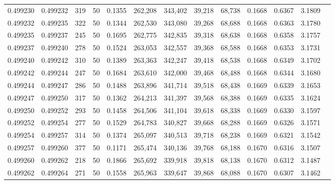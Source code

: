 \begin{tabular}{rrrrrrrrrrrrr}
0.499230 & 0.499232 & 319 &  50 &                                     0.1355 & 262,208 & 343,402 &  39,218 &  68,738 & 0.1668 & 0.6367 & 3.1809 \\
0.499232 & 0.499235 & 322 &  50 &                                     0.1344 & 262,530 & 343,080 &  39,268 &  68,688 & 0.1668 & 0.6363 & 3.1780 \\
0.499235 & 0.499237 & 245 &  50 &                                     0.1695 & 262,775 & 342,835 &  39,318 &  68,638 & 0.1668 & 0.6358 & 3.1757 \\
0.499237 & 0.499240 & 278 &  50 &                                     0.1524 & 263,053 & 342,557 &  39,368 &  68,588 & 0.1668 & 0.6353 & 3.1731 \\
0.499240 & 0.499242 & 310 &  50 &                                     0.1389 & 263,363 & 342,247 &  39,418 &  68,538 & 0.1668 & 0.6349 & 3.1702 \\
0.499242 & 0.499244 & 247 &  50 &                                     0.1684 & 263,610 & 342,000 &  39,468 &  68,488 & 0.1668 & 0.6344 & 3.1680 \\
0.499244 & 0.499247 & 286 &  50 &                                     0.1488 & 263,896 & 341,714 &  39,518 &  68,438 & 0.1669 & 0.6339 & 3.1653 \\
0.499247 & 0.499250 & 317 &  50 &                                     0.1362 & 264,213 & 341,397 &  39,568 &  68,388 & 0.1669 & 0.6335 & 3.1624 \\
0.499250 & 0.499252 & 293 &  50 &                                     0.1458 & 264,506 & 341,104 &  39,618 &  68,338 & 0.1669 & 0.6330 & 3.1597 \\
0.499252 & 0.499254 & 277 &  50 &                                     0.1529 & 264,783 & 340,827 &  39,668 &  68,288 & 0.1669 & 0.6326 & 3.1571 \\
0.499254 & 0.499257 & 314 &  50 &                                     0.1374 & 265,097 & 340,513 &  39,718 &  68,238 & 0.1669 & 0.6321 & 3.1542 \\
0.499257 & 0.499260 & 377 &  50 &                                     0.1171 & 265,474 & 340,136 &  39,768 &  68,188 & 0.1670 & 0.6316 & 3.1507 \\
0.499260 & 0.499262 & 218 &  50 &                                     0.1866 & 265,692 & 339,918 &  39,818 &  68,138 & 0.1670 & 0.6312 & 3.1487 \\
0.499262 & 0.499264 & 271 &  50 &                                     0.1558 & 265,963 & 339,647 &  39,868 &  68,088 & 0.1670 & 0.6307 & 3.1462 \\

\end{tabular}
